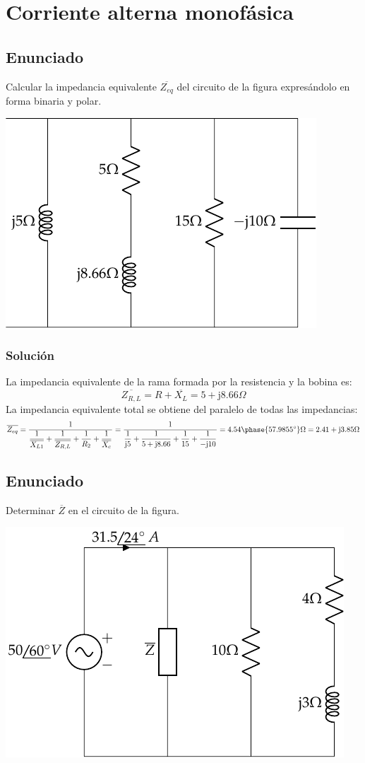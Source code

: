 \chapter{Corriente alterna monofásica}

\section{Enunciado}
Calcular la impedancia equivalente $\overline{Z_{eq}}$ del circuito de
la figura expresándolo en forma binaria y polar.
\begin{center}
  \includegraphics[width=0.4\linewidth]{figuras/BT2_01.pdf}
\end{center}

\subsection*{Solución}

La impedancia equivalente de la rama formada por la resistencia y la
bobina es:
\begin{equation*}
  \overline{Z_{R,L}}=R+\overline{X_L}=5+\mathrm{j}8.66\Omega
\end{equation*}
La impedancia equivalente total se obtiene del paralelo de todas las
impedancias:
\begin{equation*}
  \overline{Z_{eq}}=\dfrac{1}{\dfrac{1}{\overline{X_{L1}}}+\dfrac{1}{\overline{Z_{R,L}}}+\dfrac{1}{R_2}+\dfrac{1}{\overline{X_c}}}=\dfrac{1}{\dfrac{1}{\mathrm{j}5}+\dfrac{1}{5+\mathrm{j}8.66}+\dfrac{1}{15}+\dfrac{1}{-\mathrm{j}10}}=4.54\phase{57.9855^\circ}\Omega=2.41+\mathrm{j}3.85\Omega
\end{equation*}



\section{Enunciado}
Determinar $\overline{Z}$ en el circuito de la figura.
\begin{center}
  \includegraphics[width=0.4\linewidth]{figuras/BT2_02.pdf}
\end{center}

